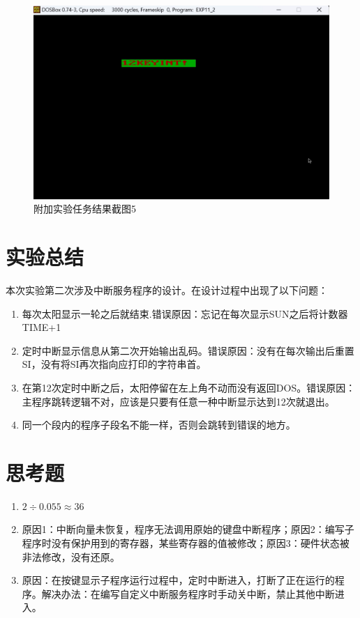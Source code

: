 \documentclass[12pt, a4paper, oneside]{ctexart}
\begin{document}
\begin{figure}[H]
    \centering
    \centering
    \includegraphics[scale=0.4]{pic/exp11-2-5.png}
    \caption{附加实验任务结果截图5}
    \label{附加实验任务结果截图5}
\end{figure}
\section{实验总结}
本次实验第二次涉及中断服务程序的设计。在设计过程中出现了以下问题：
\begin{enumerate}
    \item 每次太阳显示一轮之后就结束.错误原因：忘记在每次显示SUN之后将计数器TIME+1
    \item 定时中断显示信息从第二次开始输出乱码。错误原因：没有在每次输出后重置SI，没有将SI再次指向应打印的字符串首。
    \item 在第12次定时中断之后，太阳停留在左上角不动而没有返回DOS。错误原因：主程序跳转逻辑不对，应该是只要有任意一种中断显示达到12次就退出。
    \item 同一个段内的程序子段名不能一样，否则会跳转到错误的地方。
\end{enumerate}
\section{思考题}
\begin{enumerate}
    \item $2 \div 0.055 \approx 36$
    \item 原因1：中断向量未恢复，程序无法调用原始的键盘中断程序；原因2：编写子程序时没有保护用到的寄存器，某些寄存器的值被修改；原因3：硬件状态被非法修改，没有还原。
    \item 原因：在按键显示子程序运行过程中，定时中断进入，打断了正在运行的程序。解决办法：在编写自定义中断服务程序时手动关中断，禁止其他中断进入。
\end{enumerate}
\end{document}
